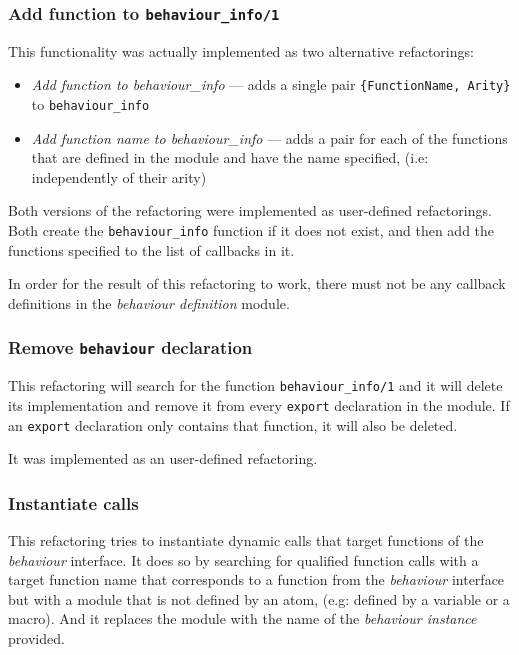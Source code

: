 \subsubsection{Add function to \texttt{behaviour\_info/1}\label{sub:add_callback}}

This functionality was actually implemented as two alternative refactorings:
\begin{itemize}
\item \emph{Add function to behaviour\_info} --- adds a single pair \texttt{\{FunctionName,
Arity\}} to \texttt{behaviour\_info}
\item \emph{Add function name to behaviour\_info} --- adds a pair for each
of the functions that are defined in the module and have the name
specified, (i.e: independently of their arity)
\end{itemize}
Both versions of the refactoring were implemented as user-defined
refactorings. Both create the \texttt{behaviour\_info} function if
it does not exist, and then add the functions specified to the list
of callbacks in it.

In order for the result of this refactoring to work, there must not
be any callback definitions in the \emph{behaviour definition} module.


\subsubsection{Remove \texttt{behaviour} declaration\label{sub:remove_behav_dec}}

This refactoring will search for the function \texttt{behaviour\_info/1}
and it will delete its implementation and remove it from every \texttt{export}
declaration in the module. If an \texttt{export} declaration only
contains that function, it will also be deleted.

It was implemented as an user-defined refactoring.


\subsubsection{Instantiate calls\label{sub:instantiate_calls}}

This refactoring tries to instantiate dynamic calls that target functions
of the \emph{behaviour} interface. It does so by searching for qualified
function calls with a target function name that corresponds to a function
from the \emph{behaviour} interface but with a module that is not
defined by an atom, (e.g: defined by a variable or a macro). And it
replaces the module with the name of the \emph{behaviour instance}
provided.

